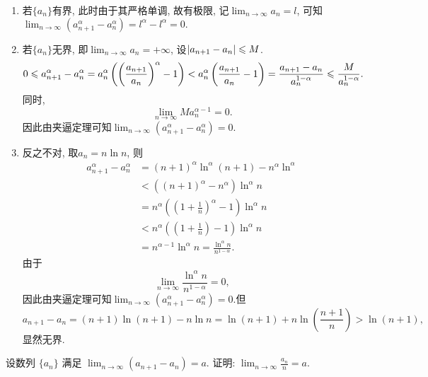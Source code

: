 \begin{solution}
    \begin{enumerate}[(1)]
        \item 若$\{a_n\}$有界, 此时由于其严格单调, 故有极限, 记$\lim_{n\to\infty}a_n=l$, 可知$\lim_{n \to \infty} (a_{n+1}^\alpha - a_n^\alpha) = l^\alpha-l^\alpha=0.$
        \item 若$\{a_n\}$无界, 即$\lim_{n\to\infty}a_n=+\infty$, 设$\left|a_{n+1}-a_n\right| \leqslant M$.
              \begin{align*}
                  0\leqslant a_{n+1}^\alpha - a_n^\alpha & =a_n^\alpha\left(\left(\frac{a_{n+1}}{a_n}\right)^\alpha - 1\right) <a_n^\alpha\left(\frac{a_{n+1}}{a_n} - 1\right)=\frac{a_{n+1}-a_n}{a_n^{1-\alpha}} \leqslant\frac{M}{a_n^{1-\alpha}}.
              \end{align*}
              同时, $$\lim_{n\to\infty}Ma_n^{\alpha-1}=0.$$
              因此由夹逼定理可知$\lim_{n \to \infty} (a_{n+1}^\alpha - a_n^\alpha) = 0$.
        \item 反之不对, 取$a_n=n\ln n$, 则\begin{align*}
                  a_{n+1}^\alpha-a_n^\alpha & =(n+1)^\alpha\ln^\alpha(n+1)-n^\alpha\ln^\alpha                       \\
                                            & <\left((n+1)^\alpha-n^\alpha\right)\ln^\alpha n                       \\
                                            & =n^\alpha\left(\left(1+\frac{1}{n}\right)^\alpha-1\right)\ln^\alpha n \\
                                            & <n^\alpha\left(\left(1+\frac{1}{n}\right)-1\right)\ln^\alpha n        \\
                                            & =n^{\alpha-1}\ln^\alpha n=\frac{\ln^\alpha n}{n^{1-\alpha}}.
              \end{align*}
              由于$$\lim_{n\to\infty}\frac{\ln^\alpha n}{n^{1-\alpha}}=0, $$因此由夹逼定理可知$\lim_{n \to \infty} (a_{n+1}^\alpha - a_n^\alpha) = 0$.但$$a_{n+1}-a_n=(n+1)\ln(n+1)-n\ln n=\ln (n+1)+n\ln\left(\frac{n+1}{n}\right)>\ln(n+1), $$显然无界.
    \end{enumerate}
\end{solution}

\begin{exercise}[1.C.7]
    设数列 $\{a_n\}$ 满足 $\lim_{n \to \infty} (a_{n+1}-a_n) = a$. 证明: $\lim_{n \to \infty} \frac{a_n}{n} = a$.
\end{exercise}

